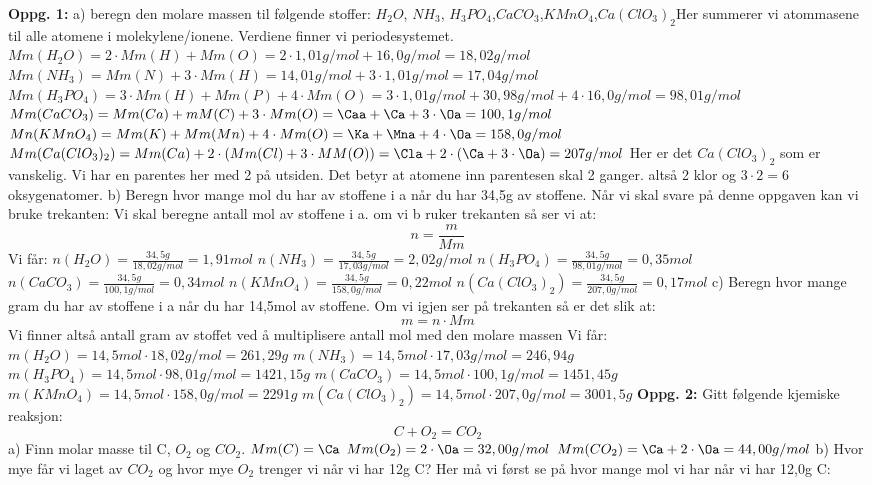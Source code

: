 \documentclass[12pt,a4paper]{article}
\begin{document}
\begin{center}
\end{center}\vspace{1cm}
\textbf{Oppg. 1:}\nl
a) beregn den molare massen til følgende stoffer:\nl
$H_2O$, $NH_3$, $H_3PO_4$,$CaCO_3$,$KMnO_4$,$Ca(ClO_3)_2$\nl[2]
Her summerer vi atommasene til alle atomene i molekylene/ionene. Verdiene finner vi periodesystemet.\nl
$Mm(H_2O)=2\cdot Mm(H)+Mm(O)=2\cdot 1,01g/mol+16,0g/mol=18,02g/mol$\nl
$Mm(NH_3)=Mm(N)+3\cdot Mm(H)=14,01g/mol+3\cdot 1,01g/mol=17,04g/mol$\nl
$Mm(H_3PO_4)=3\cdot Mm(H)+Mm(P)+4\cdot Mm(O)=3\cdot 1,01g/mol+30,98g/mol+4\cdot 16,0g/mol=98,01g/mol$\nl
$Mm(CaCO_3)=Mm(Ca)+mM(C)+3\cdot Mm(O)=\Caa+\Ca+3\cdot \Oa=100,1g/mol$\nl
$Mn(KMnO_4)=Mm(K)+Mm(Mn)+4\cdot Mm(O)=\Ka+\Mna+4\cdot \Oa=158,0g/mol$\nl
$Mm(Ca(ClO_3)_2)=Mm(Ca)+2\cdot (Mm(Cl)+3\cdot MM(O))=\Cla+2\cdot(\Ca+3\cdot\Oa)=207g/mol$\nl
Her er det $Ca(ClO_3)_2$ som er vanskelig.  Vi har en parentes her med 2 på utsiden.  Det betyr at atomene inn parentesen skal 2 ganger. altså 2 klor og $3\cdot 2=6$ oksygenatomer. 
\newpage
b) Beregn hvor mange mol du har av stoffene i a når du har 34,5g av stoffene.\nl
Når vi skal svare på denne oppgaven kan vi bruke trekanten:\nl
\trekant\nl[2]
Vi skal beregne antall mol av stoffene i a. om vi b ruker trekanten så ser vi at:\nl
$$n=\frac{m}{Mm}$$\nl
Vi får:\nl
$n(H_2O)=\frac{34,5g}{18,02g/mol}=1,91mol$\nl
$n(NH_3)=\frac{34,5g}{17,03g/mol}=2,02g/mol$\nl
$n(H_3PO_4)=\frac{34,5g}{98,01g/mol}=0,35mol$\nl
$n(CaCO_3)=\frac{34,5g}{100,1g/mol}=0,34mol$\nl
$n(KMnO_4)=\frac{34,5g}{158,0g/mol}=0,22mol$\nl
$n(Ca(ClO_3)_2)=\frac{34,5g}{207,0g/mol}=0,17mol$\nl
\newpage
c) Beregn hvor mange gram du har av stoffene i a når du har 14,5mol av stoffene.\nl
Om vi igjen ser på  trekanten så er det slik at:
$$m=n\cdot Mm$$\nl
Vi finner altså antall gram av stoffet ved å multiplisere antall mol med den molare massen\nl
Vi får:
$m(H_2O)=14,5mol\cdot 18,02g/mol=261,29g$\nl
$m(NH_3)=14,5mol\cdot 17,03g/mol=246,94g$\nl
$m(H_3PO_4)=14,5mol\cdot 98,01g/mol=1421,15g$\nl
$m(CaCO_3)=14,5mol\cdot 100,1g/mol=1451,45g$\nl
$m(KMnO_4)=14,5mol\cdot 158,0g/mol=2291g$\nl
$m(Ca(ClO_3)_2)=14,5mol\cdot 207,0g/mol=3001,5g$\nl
\nl[2]
\textbf{Oppg. 2:}\nl
Gitt følgende kjemiske reaksjon:\nl
$$C+O_2=CO_2$$\nl
a) Finn molar masse til C, $O_2$ og $CO_2$.\nl
$Mm(C)=\Ca$\nl
$Mm(O_2)=2\cdot\Oa=32,00g/mol$\nl
$Mm(CO_2)=\Ca+2\cdot \Oa=44,00g/mol$
\newpage
b) Hvor mye får vi laget av $CO_2$ og hvor mye $O_2$ trenger vi når vi har 12g C?\nl
Her må vi først se på hvor mange mol vi har når vi har 12,0g C:\nl
\end{document}

